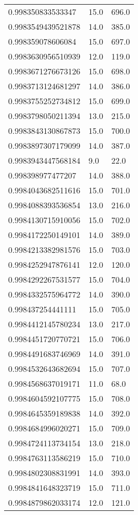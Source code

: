 \begin{center}
\begin{supertabular}[H]{p{0.30\textwidth}p{0.05\textwidth}p{0.05\textwidth}}
0.998350833533347 & 15.0 & 696.0 \\ 
0.9983549439521878 & 14.0 & 385.0 \\ 
0.998359078606084 & 15.0 & 697.0 \\ 
0.9983630956510939 & 12.0 & 119.0 \\ 
0.9983671276673126 & 15.0 & 698.0 \\ 
0.9983713124681297 & 14.0 & 386.0 \\ 
0.9983755252734812 & 15.0 & 699.0 \\ 
0.9983798050211394 & 13.0 & 215.0 \\ 
0.9983843130867873 & 15.0 & 700.0 \\ 
0.9983897307179099 & 14.0 & 387.0 \\ 
0.9983943447568184 & 9.0 & 22.0 \\ 
0.998398977477207 & 14.0 & 388.0 \\ 
0.9984043682511616 & 15.0 & 701.0 \\ 
0.9984088393536854 & 13.0 & 216.0 \\ 
0.9984130715910056 & 15.0 & 702.0 \\ 
0.9984172250149101 & 14.0 & 389.0 \\ 
0.9984213382981576 & 15.0 & 703.0 \\ 
0.9984252947876141 & 12.0 & 120.0 \\ 
0.9984292267531577 & 15.0 & 704.0 \\ 
0.9984332575964772 & 14.0 & 390.0 \\ 
0.998437254441111 & 15.0 & 705.0 \\ 
0.9984412145780234 & 13.0 & 217.0 \\ 
0.9984451720770721 & 15.0 & 706.0 \\ 
0.9984491683746969 & 14.0 & 391.0 \\ 
0.9984532643682694 & 15.0 & 707.0 \\ 
0.9984568637019171 & 11.0 & 68.0 \\ 
0.9984604592107775 & 15.0 & 708.0 \\ 
0.9984645359189838 & 14.0 & 392.0 \\ 
0.9984684996020271 & 15.0 & 709.0 \\ 
0.9984724113734154 & 13.0 & 218.0 \\ 
0.9984763113586219 & 15.0 & 710.0 \\ 
0.9984802308831991 & 14.0 & 393.0 \\ 
0.9984841648323719 & 15.0 & 711.0 \\ 
0.9984879862033174 & 12.0 & 121.0 \\ 

\end{supertabular}
\end{center}
